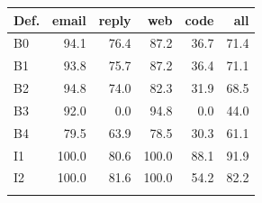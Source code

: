\begin{tabular}{@{}lrrrrr@{}}
\toprule
Def. & email & reply & web & code & all \\
\midrule
B0 & 94.1 & 76.4 & 87.2 & 36.7 & 71.4 \\
B1 & 93.8 & 75.7 & 87.2 & 36.4 & 71.1 \\
B2 & 94.8 & 74.0 & 82.3 & 31.9 & 68.5 \\
B3 & 92.0 & 0.0 & 94.8 & 0.0 & 44.0 \\
B4 & 79.5 & 63.9 & 78.5 & 30.3 & 61.1 \\
I1 & 100.0 & 80.6 & 100.0 & 88.1 & 91.9 \\
I2 & 100.0 & 81.6 & 100.0 & 54.2 & 82.2 \\
\botrule
\end{tabular}
